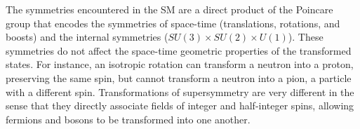 
The symmetries encountered in the SM are a direct product of the Poincare group that encodes the 
symmetries of space-time (translations, rotations, and boosts) and the internal symmetries 
($SU\left(3\right) \times SU\left(2\right) \times U\left(1\right)$). These symmetries
 do not affect the space-time geometric properties of the transformed states.
For instance, an isotropic rotation can transform a neutron into a proton, preserving the same spin, but cannot
transform a neutron into a pion, a particle with a different spin. 
Transformations of supersymmetry are very different in the sense that they directly associate 
fields of integer and half-integer spins, allowing fermions and bosons to be transformed into one another.

